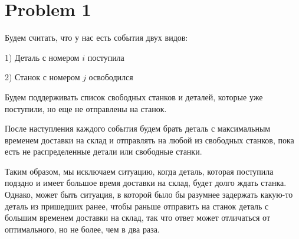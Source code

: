 \documentclass[a4paper,12pt]{article}
\begin{document}
\section{Problem 1}


Будем считать, что у нас есть события двух видов:

1) Деталь с номером $i$ поступила

2)  Станок с номером $j$ освободился

Будем поддерживать список свободных станков и деталей, которые уже поступили, но еще не отправлены на станок.

После наступления каждого события будем брать деталь с максимальным временем доставки на склад и отправлять на любой из свободных станков, пока есть не распределенные детали или свободные станки.

Таким образом, мы исключаем ситуацию, когда деталь, которая поступила подздно и имеет большое время доставки на склад, будет долго 
ждать станка. Однако, может быть ситуация, в которой было бы разумнее задержать какую-то деталь из пришедших ранее, чтобы раньше отправить на станок деталь с большим временем доставки на склад, так что ответ может отличаться от оптимального, но не более, чем в два раза.
\end{document}
